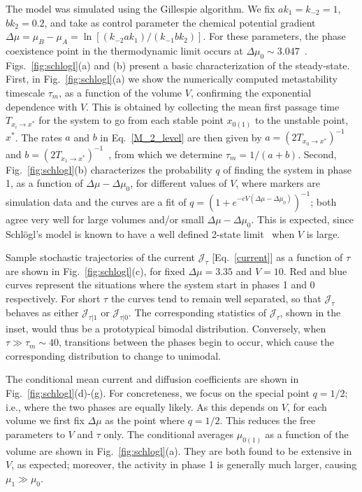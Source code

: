 \documentclass[aps,pre,reprint, amsmath, amssymb,superscriptaddress]{revtex4-1}
\begin{document}
The model was simulated using the Gillespie algorithm.
We fix $ak_1 = k_{-2} = 1$, $bk_2 = 0.2$, and take as control parameter the chemical potential gradient $\Delta \mu =\mu_B-\mu_A = \ln \left[(k_{-2}a k_1)/(k_{-1} bk_2)\right]$. 
For these parameters, the phase coexistence point in the thermodynamic limit occurs at $\Delta \mu_0 \sim 3.047$~\cite{Nguyen2020}.
Figs.~\ref{fig:schlogl}(a) and (b) present a basic characterization of the steady-state. 
First, in Fig.~\ref{fig:schlogl}(a) we show the numerically computed metastability timescale $\tau_m$, as a function of the volume $V$, confirming the exponential dependence with $V$. 
This is obtained by collecting the mean first passage time 
$T_{x_i \to x^*}$
for the system to go from each stable point $x_{0(1)}$ to the unstable point, $x^*$. 
The rates $a$ and $b$ in Eq.~\eqref{M_2_level} are then given by 
$a = (2 T_{x_0\to x^*})^{-1}$ and $b = (2 T_{x_1\to x^*})^{-1}$~\cite{Gillespie1981}, from which we determine $\tau_m = 1/(a+b)$.
Second, Fig.~\ref{fig:schlogl}(b) characterizes the probability $q$ of finding the system in phase 1, as a function of $\Delta \mu -\Delta \mu_0$, for different values of $V$, where markers are simulation data and the curves are a fit of  $q = (1+e^{-c V (\Delta\mu-\Delta \mu_0)})^{-1}$; both agree very well for large volumes and/or small \(\Delta\mu - \Delta\mu_0\).
This is expected, since Schl\"ogl's model is known to have a well defined 2-state limit~\cite{Hanggi1984,Vellela2009} when $V$ is large. 


Sample stochastic trajectories of the current $\mathcal{J}_\tau$ [Eq.~\eqref{current}] as a function of $\tau$ are shown in 
Fig.~\ref{fig:schlogl}(c), for fixed $\Delta \mu = 3.35$ and $V = 10$. 
Red and blue curves represent the situations where the system start in phases 1 and 0 respectively. 
For short $\tau$ the curves tend to remain well separated, so that $\mathcal{J}_\tau$ behaves as either $\mathcal{J}_{\tau|1}$ or $\mathcal{J}_{\tau|0}$. 
The corresponding statistics of $\mathcal{J}_\tau$, shown in the inset, would thus be a prototypical bimodal distribution. 
Conversely, when $\tau \gg \tau_m \sim 40$, transitions between the phases begin to occur, which cause the corresponding distribution to change to unimodal. 


The conditional mean current and diffusion coefficients are shown in Fig.~\ref{fig:schlogl}(d)-(g).
For concreteness, we focus on the special point $q=1/2$; i.e., where the two phases are equally likely.
As this depends on $V$, for each volume we first fix $\Delta \mu$ as the point where $q=1/2$. 
This reduces the free parameters to $V$ and $\tau$ only. 
The conditional averages $\mu_{0(1)}$ as a function of the volume are shown in Fig.~\ref{fig:schlogl}(a). 
They are both found to be extensive in $V$, as expected; moreover, the activity in phase 1 is generally much larger, causing $\mu_1 \gg \mu_0$. 
\end{document}
